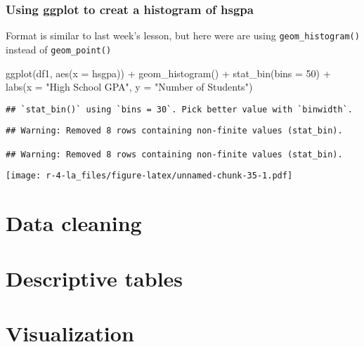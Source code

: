 \documentclass[
]{book}
\newenvironment{Shaded}{\begin{snugshade}}{\end{snugshade}}
\newcommand{\AttributeTok}[1]{\textcolor[rgb]{0.77,0.63,0.00}{#1}}
\newcommand{\DecValTok}[1]{\textcolor[rgb]{0.00,0.00,0.81}{#1}}
\newcommand{\FunctionTok}[1]{\textcolor[rgb]{0.00,0.00,0.00}{#1}}
\newcommand{\NormalTok}[1]{#1}
\newcommand{\SpecialCharTok}[1]{\textcolor[rgb]{0.00,0.00,0.00}{#1}}
\newcommand{\StringTok}[1]{\textcolor[rgb]{0.31,0.60,0.02}{#1}}
\begin{document}
\hypertarget{using-ggplot-to-creat-a-histogram-of-hsgpa}{%
\subsection{Using ggplot to creat a histogram of hsgpa}\label{using-ggplot-to-creat-a-histogram-of-hsgpa}}

Format is similar to last week's lesson, but here were are using \texttt{geom\_histogram()} instead of \texttt{geom\_point()}

\begin{Shaded}
\begin{Highlighting}[]
\FunctionTok{ggplot}\NormalTok{(df1, }\FunctionTok{aes}\NormalTok{(}\AttributeTok{x =}\NormalTok{ hsgpa)) }\SpecialCharTok{+}
  \FunctionTok{geom\_histogram}\NormalTok{() }\SpecialCharTok{+}
  \FunctionTok{stat\_bin}\NormalTok{(}\AttributeTok{bins =} \DecValTok{50}\NormalTok{) }\SpecialCharTok{+}
  \FunctionTok{labs}\NormalTok{(}\AttributeTok{x =} \StringTok{"High School GPA"}\NormalTok{, }\AttributeTok{y =} \StringTok{"Number of Students"}\NormalTok{)}
\end{Highlighting}
\end{Shaded}

\begin{verbatim}
## `stat_bin()` using `bins = 30`. Pick better value with `binwidth`.
\end{verbatim}

\begin{verbatim}
## Warning: Removed 8 rows containing non-finite values (stat_bin).

## Warning: Removed 8 rows containing non-finite values (stat_bin).
\end{verbatim}

\texttt{[image: r-4-la\_files/figure-latex/unnamed-chunk-35-1.pdf]}

\hypertarget{data-cleaning}{%
\chapter{Data cleaning}\label{data-cleaning}}

\hypertarget{descriptive-tables}{%
\chapter{Descriptive tables}\label{descriptive-tables}}

\hypertarget{visualization}{%
\chapter{Visualization}\label{visualization}}

\backmatter
  
\end{document}
